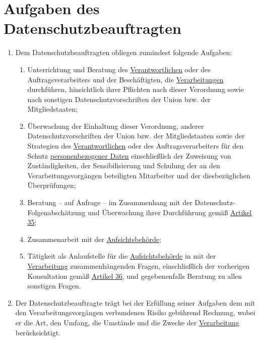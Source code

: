 \chapter{Aufgaben des Datenschutzbeauftragten}
\label{ch:39}


\begin{enumerate}

  \item Dem Datenschutzbeauftragten obliegen zumindest folgende Aufgaben:
  \label{itm:39-1}

  \begin{enumerate}
  
    \item Unterrichtung und Beratung des \hyperref[itm:04-7]{Verantwortlichen} oder des Auftragsverarbeiters und der Beschäftigten, die
     \hyperref[itm:04-2]{Verarbeitungen} durchführen, hinsichtlich ihrer Pflichten nach dieser Verordnung sowie nach sonstigen
     Datenschutzvorschriften der Union bzw. der Mitgliedstaaten;
    \label{itm:39-1a}

    \item Überwachung der Einhaltung dieser Verordnung, anderer Datenschutzvorschriften der Union bzw. der
     Mitgliedstaaten sowie der Strategien des \hyperref[itm:04-7]{Verantwortlichen} oder des Auftragsverarbeiters für den Schutz
     \hyperref[itm:04-1]{personenbezogener Daten} einschließlich der Zuweisung von Zuständigkeiten, der Sensibilisierung und Schulung der an
     den Verarbeitungsvorgängen beteiligten Mitarbeiter und der diesbezüglichen Überprüfungen;
    \label{itm:39-1b}

    \item Beratung -- auf Anfrage -- im Zusammenhang mit der Datenschutz-Folgenabschätzung und Überwachung ihrer
     Durchführung gemäß \hyperref[ch:35]{Artikel 35};
    \label{itm:39-1c}

    \item Zusammenarbeit mit der \hyperref[itm:04-21]{Aufsichtsbehörde};
    \label{itm:39-1d}

    \item Tätigkeit als Anlaufstelle für die \hyperref[itm:04-21]{Aufsichtsbehörde} in mit der \hyperref[itm:04-2]{Verarbeitung} zusammenhängenden Fragen,
     einschließlich der vorherigen Konsultation gemäß \hyperref[ch:36]{Artikel 36}, und gegebenenfalls Beratung zu
     allen sonstigen Fragen.
    \label{itm:39-1e}

  \end{enumerate}

  \item Der Datenschutzbeauftragte trägt bei der Erfüllung seiner Aufgaben dem mit den Verarbeitungsvorgängen
   verbundenen Risiko gebührend Rechnung, wobei er die Art, den Umfang, die Umstände und die Zwecke der \hyperref[itm:04-2]{Verarbeitung}
   berücksichtigt.
  \label{itm:39-e}

\end{enumerate}



